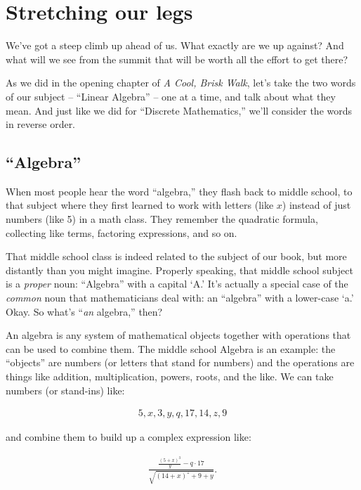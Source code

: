 
\chapter{Stretching our legs}
\label{ch:intro}

We've got a steep climb up ahead of us. What exactly are we up against? And
what will we see from the summit that will be worth all the effort to get
there?

As we did in the opening chapter of \textit{A Cool, Brisk Walk}, let's take the
two words of our subject -- ``Linear Algebra'' -- one at a time, and talk about
what they mean. And just like we did for ``Discrete Mathematics,'' we'll
consider the words in reverse order.

\section{``Algebra''}

When most people hear the word ``algebra,'' they flash back to middle school,
to that subject where they first learned to work with letters (like $x$)
instead of just numbers (like 5) in a math class. They remember the quadratic
formula, collecting like terms, factoring expressions, and so on.

That middle school class is indeed related to the subject of our book, but more
distantly than you might imagine. Properly speaking, that middle school subject
is a \textit{proper} noun: ``Algebra'' with a capital `A.' It's actually a
special case of the \textit{common} noun that mathematicians deal with: an
``algebra'' with a lower-case `a.' Okay. So what's ``\textit{an} algebra,''
then?

\label{mathematicalObject}
An algebra is any system of mathematical objects together with operations that
can be used to combine them. The middle school Algebra is an example: the
``objects'' are numbers (or letters that stand for numbers) and the operations
are things like addition, multiplication, powers, roots, and the like. We can
take numbers (or stand-ins) like:

\vspace{-.25in}
\begin{align*}
5, x, 3, y, q, 17, 14, z, 9
\end{align*}

and combine them to build up a complex expression like:

\vspace{-.25in}
\begin{align*}
\frac{\frac{(5+x)^3}{y} - q\cdot 17}{\sqrt{(14+x)^z + 9+y}}.
\end{align*}

